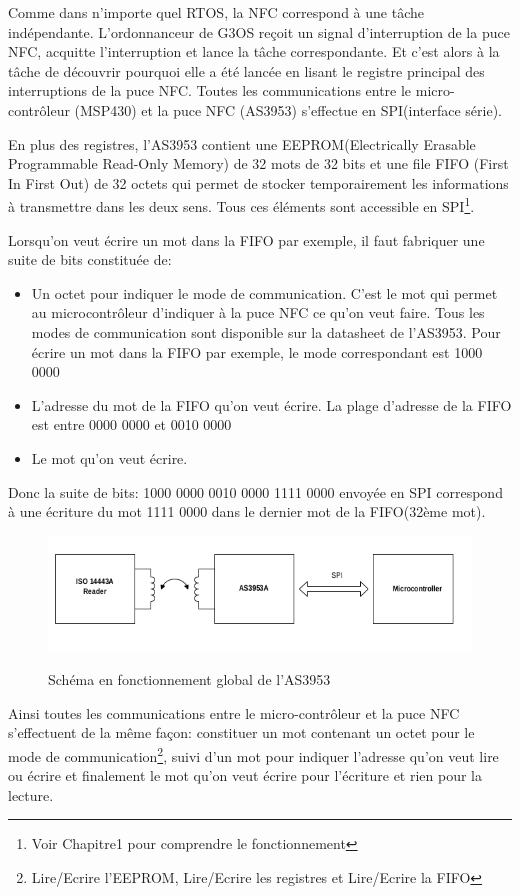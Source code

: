 \documentclass{themeensg}
\begin{document}
Comme dans n'importe quel RTOS, la NFC correspond à une tâche indépendante. L'ordonnanceur de G3OS reçoit un signal d'interruption de la puce NFC, acquitte l'interruption et lance la tâche correspondante. Et c'est alors à la tâche de découvrir pourquoi elle a été lancée en lisant le registre principal des interruptions de la puce NFC. Toutes les communications entre le micro-contrôleur (MSP430) et la puce NFC (AS3953) s'effectue en SPI(interface série).

En plus des registres, l'AS3953 contient une EEPROM(Electrically Erasable Programmable Read-Only Memory) de 32 mots de 32 bits et une file FIFO (First In First Out) de 32 octets qui permet de stocker temporairement les informations à transmettre dans les deux sens. Tous ces éléments sont accessible en SPI\footnote{Voir Chapitre1 pour comprendre le fonctionnement}.

Lorsqu'on veut écrire un mot dans la FIFO par exemple, il faut fabriquer une suite de bits constituée de:
\begin{itemize}
\item Un octet pour indiquer le mode de communication. C'est le mot qui permet au microcontrôleur d'indiquer à la puce NFC ce qu'on veut faire. Tous les modes de communication sont disponible sur la datasheet de l'AS3953. Pour écrire un mot dans la FIFO par exemple, le mode correspondant est 1000 0000
\item L'adresse du mot de la FIFO qu'on veut écrire. La plage d'adresse de la FIFO est entre 0000 0000 et 0010 0000
\item Le mot qu'on veut écrire.
\end{itemize}
Donc la suite de bits: 1000 0000 0010 0000 1111 0000 envoyée en SPI correspond à une écriture du mot 1111 0000 dans le dernier mot de la FIFO(32ème mot).
\begin{figure}[h!]
\centering
\includegraphics[scale=0.8]{images/blockdiagram.png}
\label{fig:blockdiagram}
\caption{Schéma en fonctionnement global de l'AS3953}
\end{figure}

Ainsi toutes les communications entre le micro-contrôleur et la puce NFC s'effectuent de la même façon: constituer un mot contenant un octet pour le mode de communication\footnote{Lire/Ecrire l'EEPROM, Lire/Ecrire les registres et Lire/Ecrire la FIFO}, suivi d'un mot pour indiquer l'adresse qu'on veut lire ou écrire et finalement le mot qu'on veut écrire pour l'écriture et rien pour la lecture.
\end{document}
